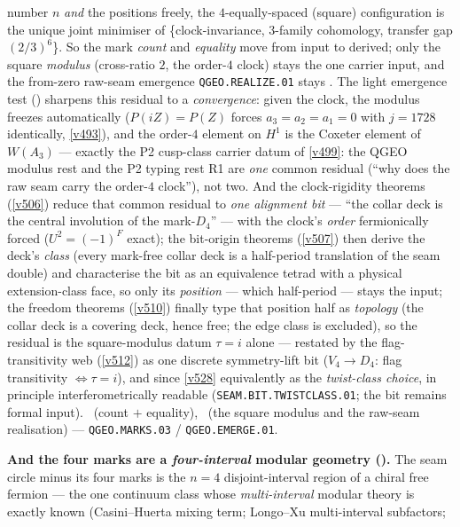 number $n$ \emph{and} the positions freely, the $4$-equally-spaced (square) configuration is the unique joint
minimiser of \{clock-invariance, $3$-family cohomology, transfer gap $(2/3)^6$\}. So the mark \emph{count}
and \emph{equality} move from input to derived; only the square \emph{modulus} (cross-ratio $2$, the order-$4$
clock) stays the one carrier input, and the from-zero raw-seam emergence \texttt{QGEO.REALIZE.01} stays \mO.
The light emergence test () sharpens this residual to a
\emph{convergence}: given the clock, the modulus freezes automatically ($P(iZ)=P(Z)$ forces
$a_3=a_2=a_1=0$ with $j=1728$ identically, \vref{v493}), and the order-$4$ element on $H^1$ is the
Coxeter element of $W(A_3)$ --- exactly the P2 cusp-class carrier datum of \vref{v499}: the QGEO
modulus rest and the P2 typing rest R1 are \emph{one} common residual (``why does the raw seam carry
the order-$4$ clock''), not two. And the clock-rigidity theorems (\vref{v506}) reduce that common
residual to \emph{one alignment bit} --- ``the collar deck is the central involution of the
mark-$D_4$'' --- with the clock's \emph{order} fermionically forced ($U^2=(-1)^F$ exact); the
bit-origin theorems (\vref{v507}) then derive the deck's \emph{class} (every mark-free collar deck
is a half-period translation of the seam double) and characterise the bit as an equivalence tetrad
with a physical extension-class face, so only its \emph{position} --- which half-period --- stays
the input; the freedom theorems (\vref{v510}) finally type that position half as \emph{topology}
(the collar deck is a covering deck, hence free; the edge class is excluded), so the residual is the
square-modulus datum $\tau=i$ alone --- restated by the flag-transitivity web (\vref{v512}) as one
discrete symmetry-lift bit ($V_4\to D_4$: flag transitivity $\iff\tau=i$), and since \vref{v528}
equivalently as the \emph{twist-class choice}, in principle interferometrically readable
(\texttt{SEAM.BIT.TWISTCLASS.01}; the bit remains formal input).
\mE\ (count $+$ equality), \mO\ (the square modulus and the raw-seam realisation) --- \texttt{QGEO.MARKS.03} /
\texttt{QGEO.EMERGE.01}.
\par\smallskip\noindent\textbf{And the four marks are a \emph{four-interval} modular geometry
().} The seam circle minus its four marks is the $n{=}4$
disjoint-interval region of a chiral free fermion --- the one continuum class whose \emph{multi-interval}
modular theory is exactly known (Casini--Huerta mixing term; Longo--Xu multi-interval subfactors;
